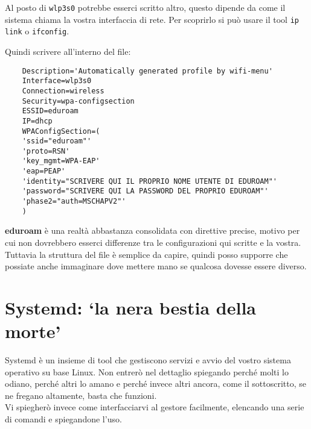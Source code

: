 \documentclass[twoside,italian]{book}
\newcommand{\code}[1]{\texttt{#1}}
\begin{document}
			\begin{tcolorbox}[floatplacement=b,width=\textwidth,colback={blue},title={NOTA BENE:},colbacktitle=gray,coltitle=white,colupper=white]
				Al posto di \code{wlp3s0} potrebbe esserci scritto altro, questo dipende da come il sistema chiama la vostra interfaccia di rete. Per scoprirlo si può usare il tool \code{ip link} o \code{ifconfig}.
			\end{tcolorbox}
			
			Quindi scrivere all'interno del file:
\begin{lstlisting}
	Description='Automatically generated profile by wifi-menu'
	Interface=wlp3s0
	Connection=wireless
	Security=wpa-configsection
	ESSID=eduroam
	IP=dhcp
	WPAConfigSection=(
	'ssid="eduroam"'
	'proto=RSN'
	'key_mgmt=WPA-EAP'
	'eap=PEAP'
	'identity="SCRIVERE QUI IL PROPRIO NOME UTENTE DI EDUROAM"'
	'password="SCRIVERE QUI LA PASSWORD DEL PROPRIO EDUROAM"'
	'phase2="auth=MSCHAPV2"'
	)
\end{lstlisting}
			
			\textbf{eduroam} è una realtà abbastanza consolidata con direttive precise, motivo per cui non dovrebbero esserci differenze tra le configurazioni qui scritte e la vostra. Tuttavia la struttura del file è semplice da capire, quindi posso supporre che possiate anche immaginare dove mettere mano se qualcosa dovesse essere diverso.
			
		
		\section{Systemd: `la nera bestia della morte'}
			
			Systemd è un insieme di tool che gestiscono servizi e avvio del vostro sistema operativo su base Linux. Non entrerò nel dettaglio spiegando perché molti lo odiano, perché altri lo amano e perché invece altri ancora, come il sottoscritto, se ne fregano altamente, basta che funzioni.\\
			
			Vi spiegherò invece come interfacciarvi al gestore facilmente, elencando una serie di comandi e spiegandone l'uso.
			
\end{document}
